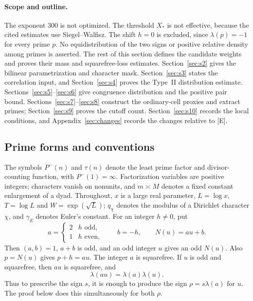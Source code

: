 \documentclass[11pt]{article}
\theoremstyle{definition}
\theoremstyle{definition}
\begin{document}
\paragraph{Scope and outline.}
The exponent $300$ is not optimized. The threshold $X_*$ is not effective,
because the cited estimates use Siegel--Walfisz. The shift $h=0$ is
excluded, since $\lambda(p)=-1$ for every prime $p$. No equidistribution
of the two signs or positive relative density among primes is asserted.
The rest of this section defines the candidate weights and proves their
mass and squarefree-loss estimates. Section~\ref{sec:s2} gives the
bilinear parametrization and character mask. Section~\ref{sec:s3}
states the correlation input, and Section~\ref{sec:s4} proves the
Type~II distribution estimate. Sections~\ref{sec:s5}--\ref{sec:s6}
give congruence distribution and the positive pair bound.
Sections~\ref{sec:s7}--\ref{sec:s8} construct the ordinary-cell proxies
and extract primes; Section~\ref{sec:s9} proves the cutoff count.
Section~\ref{sec:s10} records the local conditions, and
Appendix~\ref{sec:changes} records the changes relative to [E].

\subsection{Prime forms and conventions}\label{sec:forms}
The symbols $P^-(n)$ and $\tau(n)$ denote the least prime factor and
divisor-counting function, with $P^-(1)=\infty$. Factorization variables
are positive integers; characters vanish on nonunits, and
$m\asymp M$ denotes a fixed constant enlargement of a dyad.
Throughout, $x$ is a large real parameter, $L=\log x$, $T=\log L$ and
$W=\exp(\sqrt L)$; $q_\chi$ denotes the modulus of a Dirichlet character
$\chi$, and $\gamma_E$ denotes Euler's constant.
For an integer \(h\ne0\), put
\begin{equation}
a=\begin{cases}2&h\text{ odd},\\1&h\text{ even},\end{cases}
 \qquad b=-h,\qquad N(u)=au+b.
                                                        \tag{0.1}\label{eq:0-1}
\end{equation}
Then \((a,b)=1\), \(a+b\) is odd, and an odd integer \(u\) gives an odd \(N(u)\). Also \(p=N(u)\) gives \(p+h=au\). The integer \(a\) is squarefree. If \(u\) is odd and squarefree, then \(au\) is squarefree, and
\begin{equation}
\lambda(au)=\lambda(a)\lambda(u).
                                                        \tag{0.2}\label{eq:0-2}
\end{equation}
Thus to prescribe the sign \(s\), it is enough to produce the sign
\(\rho=s\lambda(a)\) for \(u\). The proof below does this simultaneously for both \(\rho\).
\end{document}
